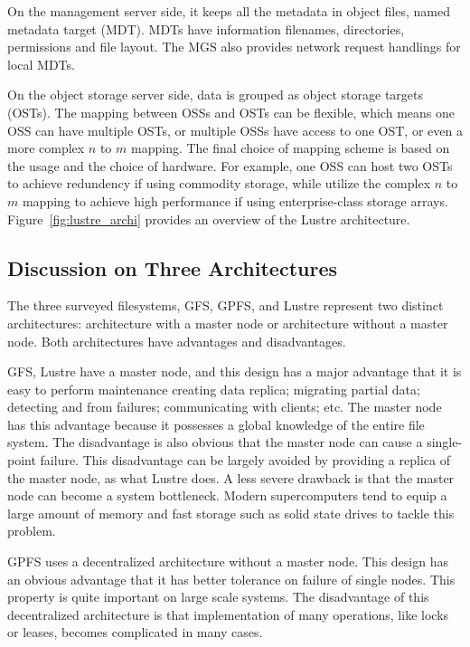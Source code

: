 On the management server side, it keeps all the metadata in object files,
named metadata target (MDT).
%
MDTs have information filenames, directories, permissions and file layout.
%
The MGS also provides network request handlings for local MDTs.

On the object storage server side, data is grouped as object storage targets
(OSTs). 
%
The mapping between OSSs and OSTs can be flexible, which means 
one OSS can have multiple OSTs, or
multiple OSSs have access to one OST, or
even a more complex $n$ to $m$ mapping.
%
The final choice of mapping scheme is based on the usage and the choice of 
hardware. 
%
For example, one OSS can host two OSTs to achieve redundency if using 
commodity storage, while utilize the complex $n$ to $m$ mapping to achieve
high performance if using enterprise-class storage arrays.
%
Figure~\ref{fig:lustre_archi} provides an overview of the Lustre architecture.


\subsection{Discussion on Three Architectures}
The three surveyed filesystems, GFS, GPFS, and Lustre represent two 
distinct architectures: architecture with a master node or 
architecture without a master node.
%
Both architectures have advantages and disadvantages.

GFS, Lustre have a master node, and this design has a major advantage
that it is easy to perform maintenance creating data replica; 
migrating partial data; detecting and 
from failures; communicating with clients; etc.
%
The master node has this advantage because it possesses a global knowledge
of the entire file system.
%
The disadvantage is also obvious that the master node can cause a 
single-point failure.
%
This disadvantage can be largely avoided by providing a replica of the master
node, as what Lustre does.
%
A less severe drawback is that the master node can become a system bottleneck.
%
Modern supercomputers tend to equip a large amount of memory and fast storage
such as solid state drives to tackle this problem.

GPFS uses a decentralized architecture without a master node.
%
This design has an obvious advantage that it has better tolerance on 
failure of single nodes.
%
This property is quite important on large scale systems.
%
The disadvantage of this decentralized architecture is that implementation
of many operations, like locks or leases, becomes complicated in many cases.
%




